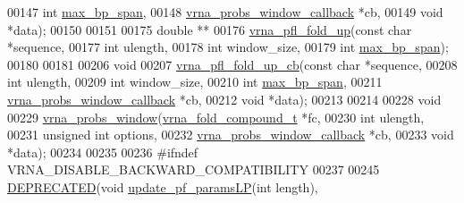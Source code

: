 \begin{DoxyCode}
00147                  \textcolor{keywordtype}{int}                        \mbox{\hyperlink{group__model__details_ga18df869af0d70101106458fc3f027806}{max\_bp\_span}},
00148                  \mbox{\hyperlink{_l_pfold_8h_abe710a1182e6db69cc75329dfc9bed67}{vrna\_probs\_window\_callback}} *cb,
00149                  \textcolor{keywordtype}{void}                       *data);
00150 
00151 
00175 \textcolor{keywordtype}{double} **
00176 \mbox{\hyperlink{group__local__pf__fold_ga1dd5c51b797c961124912e289bff553a}{vrna\_pfl\_fold\_up}}(\textcolor{keyword}{const} \textcolor{keywordtype}{char} *sequence,
00177                  \textcolor{keywordtype}{int}        ulength,
00178                  \textcolor{keywordtype}{int}        window\_size,
00179                  \textcolor{keywordtype}{int}        \mbox{\hyperlink{group__model__details_ga18df869af0d70101106458fc3f027806}{max\_bp\_span}});
00180 
00181 
00206 \textcolor{keywordtype}{void}
00207 \mbox{\hyperlink{group__local__pf__fold_ga8958d91b1f1aebfb32b58805d141ccf3}{vrna\_pfl\_fold\_up\_cb}}(\textcolor{keyword}{const} \textcolor{keywordtype}{char}                  *sequence,
00208                     \textcolor{keywordtype}{int}                         ulength,
00209                     \textcolor{keywordtype}{int}                         window\_size,
00210                     \textcolor{keywordtype}{int}                         \mbox{\hyperlink{group__model__details_ga18df869af0d70101106458fc3f027806}{max\_bp\_span}},
00211                     \mbox{\hyperlink{_l_pfold_8h_abe710a1182e6db69cc75329dfc9bed67}{vrna\_probs\_window\_callback}}  *cb,
00212                     \textcolor{keywordtype}{void}                        *data);
00213 
00214 
00228 \textcolor{keywordtype}{void}
00229 \mbox{\hyperlink{group__local__pf__fold_ga70ec33810fa17a9f67a7c59f156d0137}{vrna\_probs\_window}}(\mbox{\hyperlink{group__fold__compound_structvrna__fc__s}{vrna\_fold\_compound\_t}}        *fc,
00230                   \textcolor{keywordtype}{int}                         ulength,
00231                   \textcolor{keywordtype}{unsigned} \textcolor{keywordtype}{int}                options,
00232                   \mbox{\hyperlink{_l_pfold_8h_abe710a1182e6db69cc75329dfc9bed67}{vrna\_probs\_window\_callback}}  *cb,
00233                   \textcolor{keywordtype}{void}                        *data);
00234 
00235 
00236 \textcolor{preprocessor}{#ifndef VRNA\_DISABLE\_BACKWARD\_COMPATIBILITY}
00237 
00245 \mbox{\hyperlink{_l_pfold_8h_aab347a3c03fbe8e7319551b9fa0cce4a}{DEPRECATED}}(\textcolor{keywordtype}{void} \mbox{\hyperlink{group__local__pf__fold_ga5a019014d37fe6105131dfc2fc447880}{update\_pf\_paramsLP}}(\textcolor{keywordtype}{int} length),

\end{DoxyCode}
